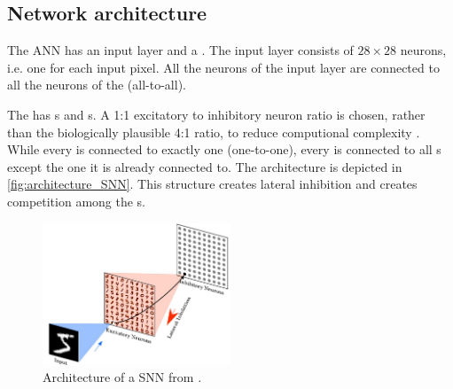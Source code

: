 \subsection{Network architecture}
\label{subsec:architecture}


The \ac{ANN} has an input layer and a \pLayer{} \cite{SNN}.
The input layer consists of $28 \times 28$ neurons, i.e. one for each input pixel.
All the neurons of the input layer are connected to all the neurons of the \pLayer{} (all-to-all).

The \pLayer{} has \eN{}s and \iN{}s.
A 1:1 excitatory to inhibitory neuron ratio is chosen, rather than the biologically plausible 4:1 ratio, 
to reduce computional complexity \cite{SNN}.
While every \eN{} is connected to exactly one \iN{} (one-to-one), every \iN{} is connected to all \eN{}s except the one it is already connected to.
The architecture is depicted in \autoref{fig:architecture_SNN}.
This structure creates lateral inhibition and creates competition among the \eN{}s.

\begin{figure}[htbp]
    \center
    \includegraphics[width=0.5\textwidth]{pictures/architecture_SNN_erste_Quelle.jpg}
    \caption{Architecture of a \ac{SNN} from \cite{SNN}.}
    \label{fig:architecture_SNN}
\end{figure}